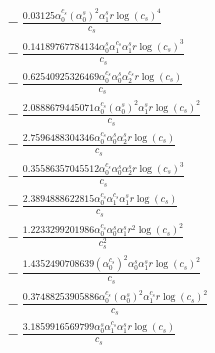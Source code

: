 \documentclass[10pt]{article}
\begin{document}
\begin{align*}
&{}  - \frac{0.03125 \alpha_{0}^{c_s} \left(\alpha_{0}^s\right)^{2} \alpha_{1}^s r \log{\left(c_{s} \right)}^{4}}{c_{s}} \\
&{}  - \frac{0.14189767784134 \alpha_{0}^s \alpha_{1}^{c_s} \alpha_{1}^s r \log{\left(c_{s} \right)}^{3}}{c_{s}} \\
&{}  - \frac{0.62540925326469 \alpha_{0}^{c_s} \alpha_{0}^s \alpha_{2}^{c_s} r \log{\left(c_{s} \right)}}{c_{s}} \\
&{}  - \frac{2.0888679445071 \alpha_{0}^{c_s} \left(\alpha_{0}^s\right)^{2} \alpha_{1}^s r \log{\left(c_{s} \right)}^{2}}{c_{s}} \\
&{}  - \frac{2.7596488304346 \alpha_{0}^{c_s} \alpha_{0}^s \alpha_{2}^s r \log{\left(c_{s} \right)}}{c_{s}} \\
&{}  - \frac{0.35586357045512 \alpha_{0}^{c_s} \alpha_{0}^s \alpha_{2}^s r \log{\left(c_{s} \right)}^{3}}{c_{s}} \\
&{}  - \frac{2.3894888622815 \alpha_{0}^{c_s} \alpha_{1}^{c_s} \alpha_{1}^s r \log{\left(c_{s} \right)}}{c_{s}} \\
&{}  - \frac{1.2233299201986 \alpha_{0}^{c_s} \alpha_{0}^s \alpha_{1}^s r^{2} \log{\left(c_{s} \right)}^{2}}{c_{s}^{2}} \\
&{}  - \frac{1.4352490708639 \left(\alpha_{0}^{c_s}\right)^{2} \alpha_{0}^s \alpha_{1}^s r \log{\left(c_{s} \right)}^{2}}{c_{s}} \\
&{}  - \frac{0.37488253905886 \alpha_{0}^{c_s} \left(\alpha_{0}^s\right)^{2} \alpha_{1}^{c_s} r \log{\left(c_{s} \right)}^{2}}{c_{s}} \\
&{}  - \frac{3.1859916569799 \alpha_{0}^s \alpha_{1}^{c_s} \alpha_{1}^s r \log{\left(c_{s} \right)}}{c_{s}}
\end{align*}
\end{document}
